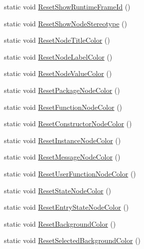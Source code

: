 \begin{DoxyCompactItemize}
static void \hyperlink{classi_c_s___preferences_controller_a5df98f1b43a4a5209dc5df9e3a96851e}{Reset\+Show\+Runtime\+Frame\+Id} ()
\item 
static void \hyperlink{classi_c_s___preferences_controller_a0d8809f75e034887607d9d6a1902ab41}{Reset\+Show\+Node\+Stereotype} ()
\item 
static void \hyperlink{classi_c_s___preferences_controller_ab9c157cf463069689ace9089b9d5c6e2}{Reset\+Node\+Title\+Color} ()
\item 
static void \hyperlink{classi_c_s___preferences_controller_ab79632ecdeaa5042bc104dd7143eabe8}{Reset\+Node\+Label\+Color} ()
\item 
static void \hyperlink{classi_c_s___preferences_controller_af5db7090acf9d9907a79f1cc1eb0855c}{Reset\+Node\+Value\+Color} ()
\item 
static void \hyperlink{classi_c_s___preferences_controller_a8af9ae73aeac2999fc46f5ffdaac59bd}{Reset\+Package\+Node\+Color} ()
\item 
static void \hyperlink{classi_c_s___preferences_controller_a862ace3b18f8d1db89540ddf514ac8c4}{Reset\+Function\+Node\+Color} ()
\item 
static void \hyperlink{classi_c_s___preferences_controller_a33202bd8364f45e2e9379097743309ba}{Reset\+Constructor\+Node\+Color} ()
\item 
static void \hyperlink{classi_c_s___preferences_controller_a6ec5c64bca2100ed296b32a928519174}{Reset\+Instance\+Node\+Color} ()
\item 
static void \hyperlink{classi_c_s___preferences_controller_add0e3adf5797a9f79e93295727e9cf8f}{Reset\+Message\+Node\+Color} ()
\item 
static void \hyperlink{classi_c_s___preferences_controller_a1d7cffac0652f81fc735515fc1d4fed1}{Reset\+User\+Function\+Node\+Color} ()
\item 
static void \hyperlink{classi_c_s___preferences_controller_abd7d74611339b7c09a951394e88e4a8f}{Reset\+State\+Node\+Color} ()
\item 
static void \hyperlink{classi_c_s___preferences_controller_a2f6bb442473eaca056e84530b1250951}{Reset\+Entry\+State\+Node\+Color} ()
\item 
static void \hyperlink{classi_c_s___preferences_controller_a881e388bee175217075217820fb673d3}{Reset\+Background\+Color} ()
\item 
static void \hyperlink{classi_c_s___preferences_controller_aab33d35914768eb9f578617fd507774b}{Reset\+Selected\+Background\+Color} ()
\item 

\end{DoxyCompactItemize}
